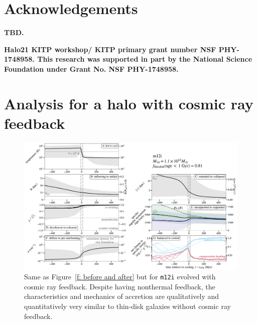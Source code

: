 \documentclass[fleqn,usenatbib]{mnras}
\begin{document}
\section*{Acknowledgements}

\textbf{TBD.}

\textbf{Halo21 KITP workshop/ KITP primary grant number NSF PHY-1748958.
This research was supported in part by the National Science Foundation under Grant No. NSF PHY-1748958.
}










\appendix

\section{Analysis for a halo with cosmic ray feedback}
\label{s: appendix-crs}

\begin{figure}
\includegraphics[width=\textwidth]{figures/before_and_after/before_and_after_m12i_cr.pdf}
\caption{
Same as Figure~\ref{f: before and after} but for \texttt{m12i} evolved with cosmic ray feedback.
Despite having nonthermal feedback, the characteristics and mechanics of accretion are qualitatively and quantitatively very similar to thin-disk galaxies without cosmic ray feedback.
}
\label{f: before and after -- cr}
\end{figure}
\end{document}
